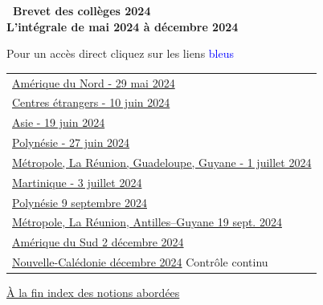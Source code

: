\documentclass[11pt]{article}
\begin{document}
\setlength\parindent{0mm}

\pagestyle{fancy}
\thispagestyle{empty}
\begin{center} {\Large \textbf{\decofourleft~Brevet des collèges 2024~\decofourright\\\vspace{1cm} L'intégrale de mai 2024 à décembre 2024}}

\vspace{1cm}

Pour un accès direct cliquez sur les liens {\Large \textcolor{blue}{bleus}}
\end{center}

\label{sommaire}
\hypertarget{sommaire}{}

\begin{tabularx}{\linewidth}{>{\Large}X}

\hyperlink{AmeriqueduNord}{Amérique du Nord - 29 mai 2024}\dotfill \pageref{AmeriqueduNord} \\[7pt]
\hyperlink{Etranger}{Centres étrangers - 10 juin 2024} \dotfill \pageref{Etranger} \\[7pt]
\hyperlink{Asie}{Asie - 19 juin 2024} \dotfill \pageref{Asie} \\[7pt]
\hyperlink{Polynesie}{Polynésie - 27 juin 2024} \dotfill \pageref{Polynesie} \\[7pt]
\hyperlink{Metropole}{Métropole, La Réunion, Guadeloupe, Guyane - 1\up{er} juillet 2024} \dotfill \pageref{Metropole}\\[7pt]
\hyperlink{Martinique}{Martinique - 3 juillet 2024} \dotfill \pageref{Martinique}\\[7pt]
\hyperlink{Polynesiesep}{Polynésie 9 septembre 2024} \dotfill \pageref{Polynesiesep} \\[7pt]
\hyperlink{Metropolesep}{Métropole, La Réunion, Antilles--Guyane 19 sept. 2024} \dotfill \pageref{Metropolesep} \\
\hyperlink{AmeriqueSud}{Amérique du Sud 2 décembre 2024}  \dotfill \pageref{AmeriqueSud} \\[7pt]
\hyperlink{Caledoniedec}{Nouvelle-Calédonie décembre 2024} Contrôle continu \dotfill \pageref{Caledoniedec} 
\end{tabularx}

\vspace{1cm}

\hyperlink{Index}{À la fin index des notions abordées}
\end{document}
